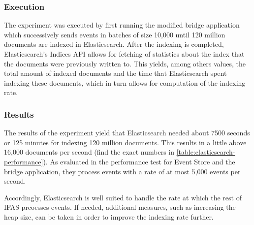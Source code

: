 
\subsubsection{Execution}

The experiment was executed by first running the modified bridge application which successively sends events in batches of size 10,000 until 120 million documents are indexed in Elasticsearch.
After the indexing is completed, Elasticsearch's Indices API allows for fetching of statistics about the index that the documents were previously written to.
This yields, among others values, the total amount of indexed documents and the time that Elasticsearch spent indexing these documents, which in turn allows for computation of the indexing rate.

\subsubsection{Results}

The results of the experiment yield that Elasticsearch needed about 7500 seconds or 125 minutes for indexing 120 million documents.
This results in a little above 16,000 documents per second (find the exact numbers in \cref{table:elasticsearch-performance}).
As evaluated in the performance test for Event Store and the bridge application, they process events with a rate of at most 5,000 events per second.

Accordingly, Elasticsearch is well suited to handle the rate at which the rest of \ac{IFAS} prcoesses events.
If needed, additional measures, such as increasing the heap size, can be taken in order to improve the indexing rate further.

